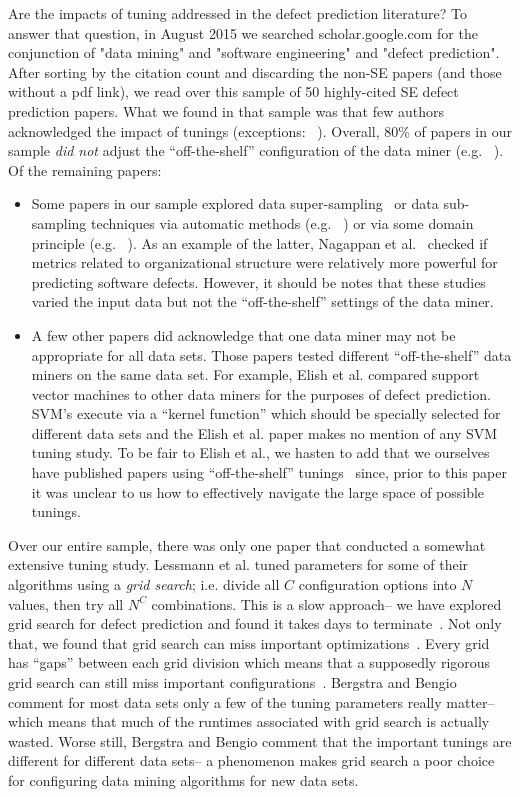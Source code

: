 \documentclass{sig-alternative}
\newcommand{\bi}{\begin{itemize}[leftmargin=0.4cm]}
\newcommand{\ei}{\end{itemize}}
\begin{document}
Are the impacts of tuning addressed in the defect prediction literature?
To answer that question,  in August 2015 we searched scholar.google.com for the conjunction of  "data mining" and "software engineering" and  "defect prediction".
After sorting by the citation count and discarding the non-SE papers (and those without a pdf link), we read over this sample
of  50 highly-cited SE defect prediction papers. 
What we found in that sample was that few authors
acknowledged the impact of tunings (exceptions: ~\cite{hall11,lessmann2008benchmarking}).
Overall,  80\% of papers in our sample {\em did not} adjust
the ``off-the-shelf'' configuration of the data miner (e.g. ~\cite{me07b,Moser:2008,herzig2013predicting,zimmermann2007predicting}). Of the remaining papers:
\bi
\item
Some papers in our sample  explored   data super-sampling~\cite{4271036} or data sub-sampling techniques via  automatic methods (e.g. ~\cite{Gao:2011,me07b,4271036,Kim:2011}) 
or via some domain principle (e.g. ~\cite{Moser:2008,Nagappan:2008,Hassan:2009}).
As an example of the latter, Nagappan et al.~\cite{Nagappan:2008} checked if metrics related to organizational structure were relatively more powerful for predicting software defects. 
However, it should be notes that  these studies varied the input data but
not the   ``off-the-shelf''   settings of the data miner.
\item
A few other papers did acknowledge that one data miner may not be appropriate
for all data sets.  Those papers tested  different  
``off-the-shelf'' data miners on the same data set.
For example, Elish et al.\cite{Elish2008649}  compared support vector
machines to other data miners for the purposes of defect prediction. SVM's execute via a ``kernel function'' which should be specially selected for different data sets and
the Elish et al. paper  makes no mention of any SVM tuning study.  
To be fair to Elish et al., we hasten to add that we
ourselves have  published
papers using ``off-the-shelf'' tunings~\cite{me07b} since,
prior to this paper it was unclear to us how to effectively
navigate the large space of possible tunings.
\ei
Over our entire sample, there was only  one paper that conducted a somewhat extensive tuning study.
Lessmann et al. tuned parameters for some of their algorithms using  a {\em grid search}; i.e. divide all $C$ configuration
options into $N$ values, then try all   $N^C$ combinations.
This is a slow approach-- we have explored grid search for 
defect prediction and found it takes days to terminate~\cite{me07b}.
Not only that, we found that grid search can miss
important optimizations~\cite{baker07}.
Every grid has ``gaps'' between each grid division which means
that a supposedly rigorous grid search can still miss
important configurations~\cite{Bergstra2012}. 
Bergstra and Bengio~\cite{Bergstra2012} comment for most data sets only a few of the tuning parameters really matter-- which means that
much of the runtimes associated with grid search is actually wasted.
Worse still, Bergstra and Bengio  comment that 
the 
important tunings are   different   for different
data sets-- a 
 phenomenon makes grid search a poor choice for configuring data mining
 algorithms for new data sets. 
 
\end{document}
